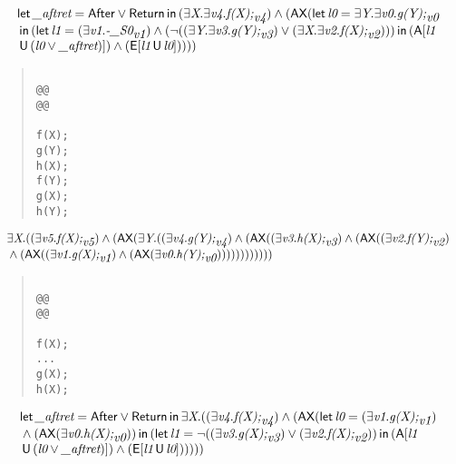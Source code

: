 \documentclass{article}
\newcommand{\U}{\,\mbox{\sf{U}}\,}
\newcommand{\A}{\mbox{\sf{A}}}
\newcommand{\E}{\mbox{\sf{E}}}
\newcommand{\AX}{\mbox{\sf{AX}}}
\newcommand{\mita}[1]{\mbox{\it{{#1}}}}
\newcommand{\msf}[1]{\mbox{\sf{{#1}}}}
\begin{document}
\[\begin{array}{l}
\mita{\sf{let}} \, \mita{\_aftret} = \msf{After} \vee \msf{Return} \, \mita{\sf{in}} \, (\exists \mita{X} . \exists \mita{v4} . \mita{f(X);}_{\mita{v4}}) \wedge (\AX(\mita{\sf{let}} \, \mita{l0} = \exists \mita{Y} . \exists \mita{v0} . \mita{g(Y);}_{\mita{v0}}\\\mbox{} \, \mita{\sf{in}} \, (\mita{\sf{let}} \, \mita{l1} = (\exists \mita{v1} . \mita{-\_S0}_{\mita{v1}}) \wedge (\neg ((\exists \mita{Y} . \exists \mita{v3} . \mita{g(Y);}_{\mita{v3}}) \vee (\exists \mita{X} . \exists \mita{v2} . \mita{f(X);}_{\mita{v2}}))) \, \mita{\sf{in}} \, (\A[\mita{l1}\\\mbox{} \U (\mita{l0} \vee \mita{\_aftret})]
) \wedge (\E[\mita{l1} \U \mita{l0}]
)
)
))

\end{array}\]

\begin{quote}\begin{verbatim}

@@
@@

f(X);
g(Y);
h(X);
f(Y);
g(X);
h(Y);
\end{verbatim}\end{quote}

\[\begin{array}{l}
\exists \mita{X} . ((\exists \mita{v5} . \mita{f(X);}_{\mita{v5}}) \wedge (\AX(\exists \mita{Y} . ((\exists \mita{v4} . \mita{g(Y);}_{\mita{v4}}) \wedge (\AX((\exists \mita{v3} . \mita{h(X);}_{\mita{v3}}) \wedge (\AX((\exists \mita{v2} . \mita{f(Y);}_{\mita{v2}})\\\mbox{} \wedge (\AX((\exists \mita{v1} . \mita{g(X);}_{\mita{v1}}) \wedge (\AX(\exists \mita{v0} . \mita{h(Y);}_{\mita{v0}}))))))))))))
\end{array}\]

\begin{quote}\begin{verbatim}

@@
@@

f(X);
...
g(X);
h(X);
\end{verbatim}\end{quote}

\[\begin{array}{l}
\mita{\sf{let}} \, \mita{\_aftret} = \msf{After} \vee \msf{Return} \, \mita{\sf{in}} \, \exists \mita{X} . ((\exists \mita{v4} . \mita{f(X);}_{\mita{v4}}) \wedge (\AX(\mita{\sf{let}} \, \mita{l0} = (\exists \mita{v1} . \mita{g(X);}_{\mita{v1}})\\\mbox{} \wedge (\AX(\exists \mita{v0} . \mita{h(X);}_{\mita{v0}})) \, \mita{\sf{in}} \, (\mita{\sf{let}} \, \mita{l1} = \neg ((\exists \mita{v3} . \mita{g(X);}_{\mita{v3}}) \vee (\exists \mita{v2} . \mita{f(X);}_{\mita{v2}})) \, \mita{\sf{in}} \, (\A[\mita{l1}\\\mbox{} \U (\mita{l0} \vee \mita{\_aftret})]
) \wedge (\E[\mita{l1} \U \mita{l0}]
)
)
)))

\end{array}\]
\end{document}
